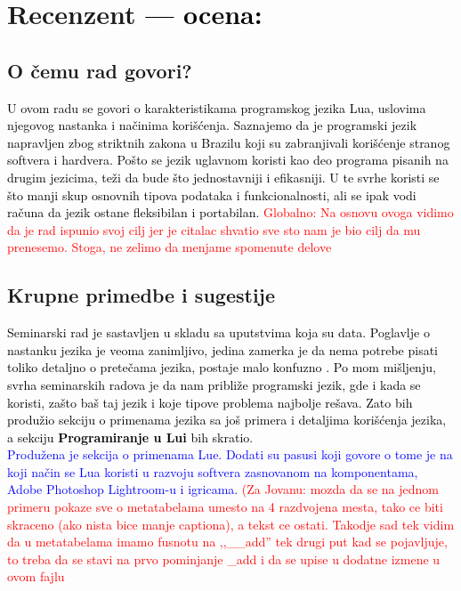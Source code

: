 \documentclass[a4paper]{report}
\newcommand{\odgovor}[1]{\textcolor{black}{#1}}
\newcommand{\odgovorAutora}[1]{\textcolor{blue}{#1}}
\newcommand{\note}[1]{\textcolor{red}{#1}}
\begin{document}
\chapter{Recenzent \odgovor{--- ocena:} }


\section{O čemu rad govori?}
\odgovor{
U ovom radu se govori o karakteristikama programskog jezika Lua, uslovima njegovog nastanka i načinima korišćenja. Saznajemo da je programski jezik napravljen zbog striktnih zakona u Brazilu koji su zabranjivali korišćenje stranog softvera i hardvera. Pošto se jezik uglavnom koristi kao deo programa pisanih na drugim jezicima, teži da bude što jednostavniji i efikasniji. U te svrhe koristi se što manji skup osnovnih tipova podataka i funkcionalnosti, ali se ipak vodi računa da jezik ostane fleksibilan i portabilan. 
}
\note{Globalno: Na osnovu ovoga vidimo da je rad ispunio svoj cilj jer je citalac shvatio sve sto nam je bio cilj da mu prenesemo. Stoga, ne zelimo da menjame spomenute delove}

\section{Krupne primedbe i sugestije}
\odgovor{
Seminarski rad je sastavljen u skladu sa uputstvima koja su data. Poglavlje o nastanku jezika je veoma zanimljivo, jedina zamerka je da nema potrebe pisati toliko detaljno o pretečama jezika, postaje malo konfuzno .\newline
Po mom mišljenju, svrha seminarskih radova je da nam približe programski jezik, gde i kada se koristi, zašto baš taj jezik i koje tipove problema najbolje rešava. Zato bih produžio sekciju o primenama jezika sa još primera i detaljima korišćenja jezika, a sekciju 
\textbf{Programiranje u Lui} bih skratio.\\
\odgovorAutora{Produžena je sekcija o primenama Lue. Dodati su pasusi koji govore o tome je na koji način se Lua koristi u razvoju softvera zasnovanom na komponentama, Adobe Photoshop Lightroom-u i igricama.}
\note{(Za Jovanu: mozda da se na jednom primeru pokaze sve o metatabelama umesto na 4 razdvojena mesta, tako ce biti skraceno (ako nista bice manje captiona), a tekst ce ostati. Takodje sad tek vidim da u metatabelama imamo fusnotu na ,,\_\_add'' tek drugi put kad se pojavljuje, to treba da se stavi na prvo pominjanje \_add i da se upise u dodatne izmene u ovom fajlu}  
}
\end{document}

